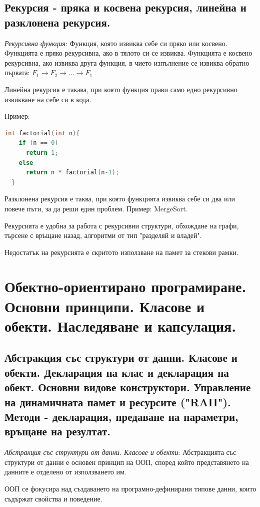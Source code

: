 \documentclass{article}
\renewcommand{\\}{\newline}
\begin{document}
\subsection{Рекурсия - пряка и косвена рекурсия, линейна и разклонена рекурсия.}

\textit{Рекурсивна функция}: Функция, която извиква себе си пряко или косвено. Функцията е пряко рекурсивна, ако в тялото си се извиква. Функцията е косвено рекурсивна, ако извиква друга функция, в чието изпълнение се извиква обратно първата: \(F_{1} \to F_{2} \to ... \to F_{1}\)

Линейна рекурсия е такава, при която функция прави само едно рекурсивно извикване на себе си в кода. 

Пример:
\begin{lstlisting}[language=C++]
  int factorial(int n){
    if (n == 0) 
      return 1;
    else
      return n * factorial(n-1);
  }
\end{lstlisting}

Разклонена рекурсия е таква, при която функцията извиква себе си два или повече пъти, за да реши един проблем. Пример: MergeSort.

Рекурсията е удобна за работа с рекурсивни структури, обхождане на графи, търсене с връщане назад, алгоритми от тип "разделяй и владей".

Недостатък на рекурсията е скритото използване на памет за стекови рамки.
\newpage

\section{Обектно-ориентирано програмиране. Основни принципи. Класове и обекти. Наследяване и капсулация.}

\subsection{Абстракция със структури от данни. Класове и обекти. Декларация на клас и декларация на обект. Основни видове конструктори. Управление на динамичната памет и ресурсите ("RAII"). Методи - декларация, предаване на параметри, връщане на резултат.}
\textit{Абстракция със структури от данни. Класове и обекти}: Абстракцията със структури от данни е основен принцип на ООП, според който представянето на данните е отделено от използването им.

ООП се фокусира над създаването на програмно-дефинирани типове данни, които съдържат свойства и поведение.
\end{document}

